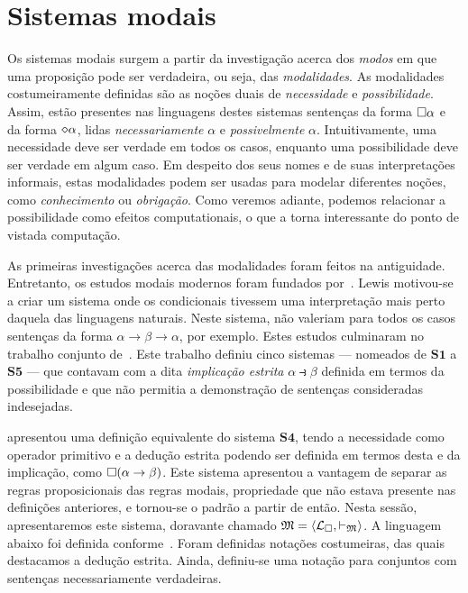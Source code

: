 \section{Sistemas modais}

Os sistemas modais surgem a partir da investigação acerca dos \emph{modos} em que uma proposição pode ser verdadeira, ou seja, das \emph{modalidades}.
As modalidades costumeiramente definidas são as noções duais de \emph{necessidade} e \emph{possibilidade}.
Assim, estão presentes nas linguagens destes sistemas sentenças da forma $\Box\alpha$ e da forma $\pos\alpha$, lidas \emph{necessariamente} $\alpha$ e \emph{possivelmente} $\alpha$.
Intuitivamente, uma necessidade deve ser verdade em todos os casos, enquanto uma possibilidade deve ser verdade em algum caso.
Em despeito dos seus nomes e de suas interpretações informais, estas modalidades podem ser usadas para modelar diferentes noções, como \emph{conhecimento} ou \emph{obrigação}.
Como veremos adiante, podemos relacionar a possibilidade como efeitos computationais, o que a torna interessante do ponto de vistada computação.

\vspace{0.5\baselineskip}
As primeiras investigações acerca das modalidades foram feitos na antiguidade.
Entretanto, os estudos modais modernos foram fundados por~\cite{Lewis}.
Lewis motivou-se a criar um sistema onde os condicionais tivessem uma interpretação mais perto daquela das linguagens naturais.
Neste sistema, não valeriam para todos os casos sentenças da forma $\alpha\to\beta\to\alpha$, por exemplo.
Estes estudos culminaram no trabalho conjunto de~\cite{Langford}.
Este trabalho definiu cinco sistemas --- nomeados de $\mathbf{S1}$ a $\mathbf{S5}$ --- que contavam com a dita \emph{implicação estrita} $\alpha\strictif\beta$ definida em termos da possibilidade e que não permitia a demonstração de sentenças consideradas indesejadas.

\vspace{0.5\baselineskip}
\cite{Goedel} apresentou uma definição equivalente do sistema $\mathbf{S4}$, tendo a necessidade como operador primitivo e a dedução estrita podendo ser definida em termos desta e da implicação, como $\Box(\alpha\to\beta)$.
Este sistema apresentou a vantagem de separar as regras proposicionais das regras modais, propriedade que não estava presente nas definições anteriores, e tornou-se o padrão a partir de então.
Nesta sessão, apresentaremos este sistema, doravante chamado $\mathfrak{M}=\langle\mathcal{L}_\Box,\vdash_\mathfrak{M}\rangle$.
A linguagem abaixo foi definida conforme~\cite{Troelstra}.
Foram definidas notações costumeiras, das quais destacamos a dedução estrita.
    Ainda, definiu-se uma notação para conjuntos com sentenças necessariamente verdadeiras.

